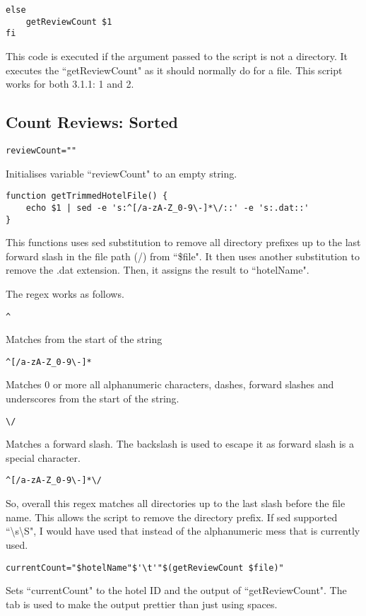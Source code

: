 \documentclass[a4paper]{article}
\begin{document}
\begin{lstlisting}
else
	getReviewCount $1
fi
\end{lstlisting}
This code is executed if the argument passed to the script is not a directory.
It executes the ``getReviewCount" as it should normally do for a file. \newline \newline
This script works for both 3.1.1: 1 and 2.

%
\subsection{Count Reviews: Sorted}
\begin{lstlisting}
reviewCount=""
\end{lstlisting}
Initialises variable ``reviewCount" to an empty string.

\begin{lstlisting}
function getTrimmedHotelFile() {
	echo $1 | sed -e 's:^[/a-zA-Z_0-9\-]*\/::' -e 's:.dat::'
}
\end{lstlisting}
This functions uses sed substitution to remove all directory prefixes up to the last forward slash in the file path (/) from ``\$file".
It then uses another substitution to remove the .dat extension.
Then, it assigns the result to ``hotelName".

The regex works as follows.
\begin{lstlisting}
^
\end{lstlisting}
Matches from the start of the string
\begin{lstlisting}
^[/a-zA-Z_0-9\-]*
\end{lstlisting}
Matches 0 or more all alphanumeric characters, dashes, forward slashes and underscores from the start of the string.
\begin{lstlisting}
\/
\end{lstlisting}
Matches a forward slash. The backslash is used to escape it as forward slash is a special character.

\begin{lstlisting}
^[/a-zA-Z_0-9\-]*\/
\end{lstlisting}
So, overall this regex matches all directories up to the last slash before the file name.
This allows the script to remove the directory prefix.
If sed supported ``\textbackslash s\textbackslash S", I would have used that instead of the alphanumeric mess that is currently used.

\begin{lstlisting}
currentCount="$hotelName"$'\t'"$(getReviewCount $file)"
\end{lstlisting}
Sets ``currentCount" to the hotel ID and the output of ``getReviewCount".
The tab is used to make the output prettier than just using spaces.
\end{document}
